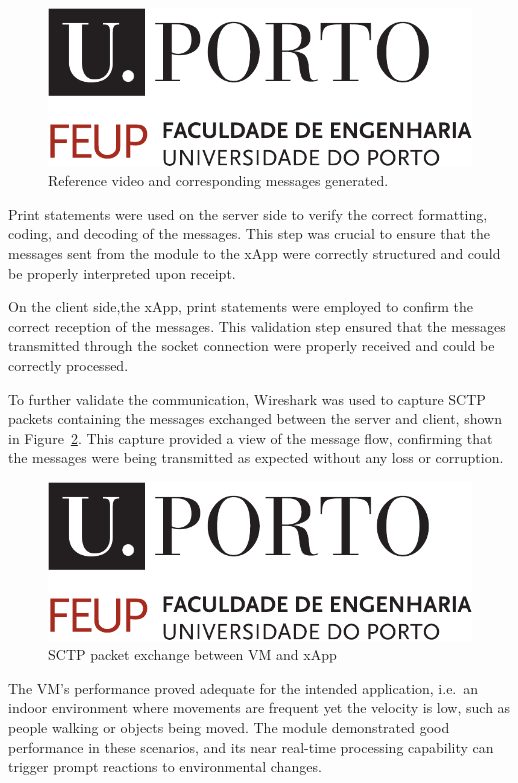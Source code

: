 \begin{figure}[H]
    \centering
    \includegraphics[width=0.5\linewidth]{figures/uporto-feup}
    \caption{Reference video and corresponding messages generated.}
    \label{fig:reference_video}
\end{figure}

Print statements were used on the server side to verify the correct formatting, coding, and decoding of the messages.
This step was crucial to ensure that the messages sent from the module to the xApp were correctly structured and could be properly interpreted upon receipt.

On the client side,the xApp, print statements were employed to confirm the correct reception of the messages.
This validation step ensured that the messages transmitted through the socket connection were properly received and could be correctly processed.

To further validate the communication, Wireshark was used to capture SCTP packets containing the messages exchanged between the server and client, shown in Figure~\ref{fig:capture_messages}.
This capture provided a view of the message flow, confirming that the messages were being transmitted as expected without any loss or corruption.

\begin{figure}[H]
    \centering
    \includegraphics[width=0.5\linewidth]{figures/uporto-feup}
    \caption[SCTP packet exchange between VM and xApp]{SCTP packet exchange between VM and xApp}
    \label{fig:capture_messages}
\end{figure}

The VM's performance proved adequate for the intended application, i.e.\ an indoor environment where movements are frequent yet the velocity is low, such as people walking or objects being moved.
The module demonstrated good performance in these scenarios, and its near real-time processing capability can trigger prompt reactions to environmental changes.

